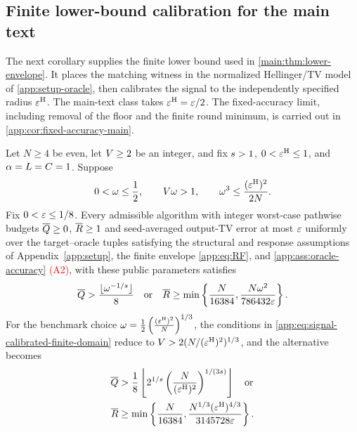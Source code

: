 \subsection{Finite lower-bound calibration for the main text}

The next corollary supplies the finite lower bound used in
\cref{main:thm:lower-envelope}. It places the matching witness in the
normalized Hellinger/TV model of \cref{app:setup-oracle}, then
calibrates the signal to the independently specified radius $\varepsilon^{\mathrm H}$.
The main-text class takes $\varepsilon^{\mathrm H}=\varepsilon/2$.
The fixed-accuracy limit, including removal of the floor and the finite
round minimum, is carried out in \cref{app:cor:fixed-accuracy-main}.

\begin{corollary}
\label{app:cor:signal-calibrated-finite-lower}
Let $N\ge4$ be even, let $V\ge2$ be an integer, and fix
$s>1$, $0<\varepsilon^{\mathrm H}\le1$, and
$\alpha=L=C=1$.
Suppose
\begin{equation}
 0<\omega\le\frac12,\qquad
 V\omega>1,\qquad
 \omega^3\le\frac{(\varepsilon^{\mathrm H})^2}{2N}.
 \label{app:eq:signal-calibrated-finite-domain}
\end{equation}
Fix $0<\varepsilon\le1/8$.  Every admissible algorithm with integer
worst-case pathwise budgets $\overline Q\ge0$, $\overline R\ge1$ and
seed-averaged output-TV error at most $\varepsilon$ uniformly over the target--oracle
tuples satisfying the structural and response assumptions of
Appendix~\ref{app:setup}, the finite envelope \eqref{app:eq:RF}, and
\textcolor{red}{\cref{app:ass:oracle-accuracy} (A2)},
with these public parameters satisfies
\begin{equation}
 \overline Q>\frac{\lfloor\omega^{-1/s}\rfloor}{8}
 \quad\text{or}\quad
 \overline R\ge
 \min\left\{\frac N{16384},
            \frac{N\omega^2}{786432\varepsilon}\right\}.
 \label{app:eq:benchmark-finite-lower}
\end{equation}
For the benchmark choice $\omega=\frac12 \left(\frac{(\varepsilon^{\mathrm H})^2}{N}\right)^{1/3}$,
the conditions in \eqref{app:eq:signal-calibrated-finite-domain} reduce to
$V>2(N/(\varepsilon^{\mathrm H})^2)^{1/3}$, and the alternative becomes
\begin{equation}
 \begin{aligned}
 \overline Q
 &>\frac18\left\lfloor
   2^{1/s}
   \left(\frac N{(\varepsilon^{\mathrm H})^2}\right)^{1/(3s)}
   \right\rfloor
 \quad\text{or}\\
 \overline R
 &\ge\min\left\{\frac N{16384},
   \frac{N^{1/3}(\varepsilon^{\mathrm H})^{4/3}}{3145728\varepsilon}\right\}.
 \end{aligned}
 \label{app:eq:signal-calibrated-direct-lower}
\end{equation}
\end{corollary}

